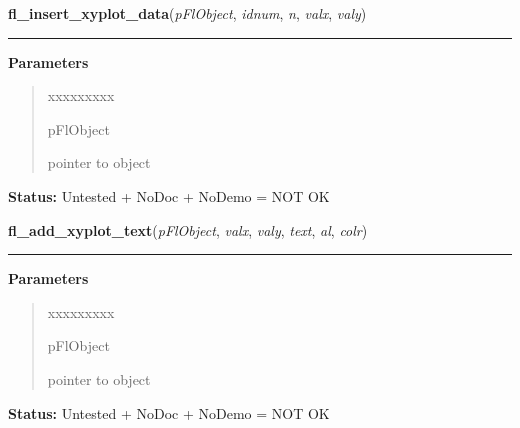 \hspace{.8\funcindent}\begin{boxedminipage}{\funcwidth}

    \raggedright \textbf{fl\_insert\_xyplot\_data}(\textit{pFlObject}, \textit{idnum}, \textit{n}, \textit{valx}, \textit{valy})

    \vspace{-1.5ex}

    \rule{\textwidth}{0.5\fboxrule}
\setlength{\parskip}{2ex}
\setlength{\parskip}{1ex}
      \textbf{Parameters}
      \vspace{-1ex}

      \begin{quote}
        \begin{Ventry}{xxxxxxxxx}

          \item[pFlObject]

          pointer to object

        \end{Ventry}

      \end{quote}

\textbf{Status:} Untested + NoDoc + NoDemo = NOT OK



    \end{boxedminipage}

    \label{xformslib:flxyplot:fl_add_xyplot_text}

    \vspace{0.5ex}

\hspace{.8\funcindent}\begin{boxedminipage}{\funcwidth}

    \raggedright \textbf{fl\_add\_xyplot\_text}(\textit{pFlObject}, \textit{valx}, \textit{valy}, \textit{text}, \textit{al}, \textit{colr})

    \vspace{-1.5ex}

    \rule{\textwidth}{0.5\fboxrule}
\setlength{\parskip}{2ex}
\setlength{\parskip}{1ex}
      \textbf{Parameters}
      \vspace{-1ex}

      \begin{quote}
        \begin{Ventry}{xxxxxxxxx}

          \item[pFlObject]

          pointer to object

        \end{Ventry}

      \end{quote}

\textbf{Status:} Untested + NoDoc + NoDemo = NOT OK



    \end{boxedminipage}

